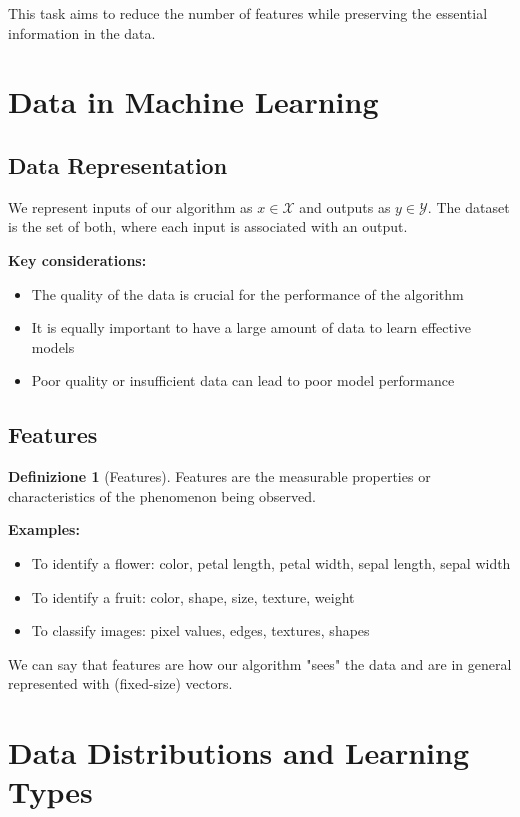\documentclass[11pt,a4paper]{article}
\theoremstyle{definition}
\newtheorem{definition}{Definizione}[section]
\theoremstyle{plain}
\theoremstyle{remark}
\begin{document}
This task aims to reduce the number of features while preserving the essential information in the data.

\section{Data in Machine Learning}

\subsection{Data Representation}

We represent inputs of our algorithm as $x \in \mathcal{X}$ and outputs as $y \in \mathcal{Y}$. The dataset is the set of both, where each input is associated with an output.

\textbf{Key considerations:}
\begin{itemize}
    \item The quality of the data is crucial for the performance of the algorithm
    \item It is equally important to have a large amount of data to learn effective models
    \item Poor quality or insufficient data can lead to poor model performance
\end{itemize}

\subsection{Features}

\begin{definition}[Features]
Features are the measurable properties or characteristics of the phenomenon being observed.
\end{definition}

\textbf{Examples:}
\begin{itemize}
    \item To identify a flower: color, petal length, petal width, sepal length, sepal width
    \item To identify a fruit: color, shape, size, texture, weight
    \item To classify images: pixel values, edges, textures, shapes
\end{itemize}

We can say that features are how our algorithm "sees" the data and are in general represented with (fixed-size) vectors.

\section{Data Distributions and Learning Types}
\end{document}
